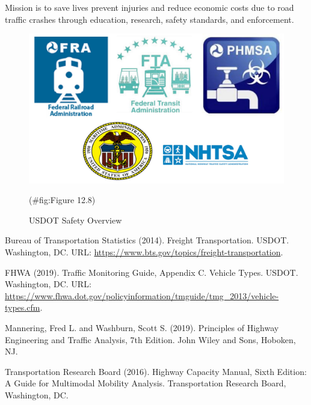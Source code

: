 \documentclass[
]{book}
\begin{document}
Mission is to save lives prevent injuries and reduce economic costs due to road traffic crashes through education, research, safety standards, and enforcement.

\begin{figure}

{\centering \includegraphics{./Images/Research organizations/USDOT Safety Overview} 

}

\caption{USDOT Safety Overview}(\#fig:Figure 12.8)
\end{figure}

Bureau of Transportation Statistics (2014). Freight Transportation. USDOT. Washington, DC. URL: \url{https://www.bts.gov/topics/freight-transportation}.

FHWA (2019). Traffic Monitoring Guide, Appendix C. Vehicle Types. USDOT. Washington, DC. URL: \url{https://www.fhwa.dot.gov/policyinformation/tmguide/tmg_2013/vehicle-types.cfm}.

Mannering, Fred L. and Washburn, Scott S. (2019). Principles of Highway Engineering and Traffic Analysis, 7th Edition. John Wiley and Sons, Hoboken, NJ.

Transportation Research Board (2016). Highway Capacity Manual, Sixth Edition: A Guide for Multimodal Mobility Analysis. Transportation Research Board, Washington, DC.

  
\end{document}
